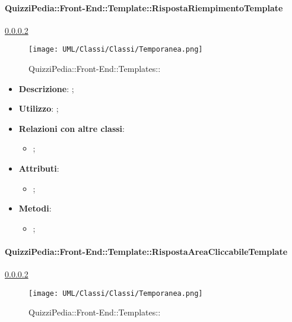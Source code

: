 		\paragraph{QuizziPedia::Front-End::Template::RispostaRiempimentoTemplate}
		
				\label{QuizziPedia::Front-End::Templates::}
				\ref{QuizziPedia::Front-End::Templates::}
				\begin{figure}[h]
					\centering
					\texttt{[image: UML/Classi/Classi/Temporanea.png]}
					\caption{QuizziPedia::Front-End::Templates::}
				\end{figure}
		
			\begin{itemize}
				\item \textbf{Descrizione}: ;
				\item \textbf{Utilizzo}: ;
				\item \textbf{Relazioni con altre classi}: 
				\begin{itemize}
					\item ;
				\end{itemize}
				\item \textbf{Attributi}: 
				\begin{itemize}
					\item ;
				\end{itemize}
				\item \textbf{Metodi}: 
				\begin{itemize}
					\item ;
				\end{itemize}
			\end{itemize}
		
		\paragraph{QuizziPedia::Front-End::Template::RispostaAreaCliccabileTemplate}
		
				\label{QuizziPedia::Front-End::Templates::}
				\ref{QuizziPedia::Front-End::Templates::}
				\begin{figure}[h]
					\centering
					\texttt{[image: UML/Classi/Classi/Temporanea.png]}
					\caption{QuizziPedia::Front-End::Templates::}
				\end{figure}
						
